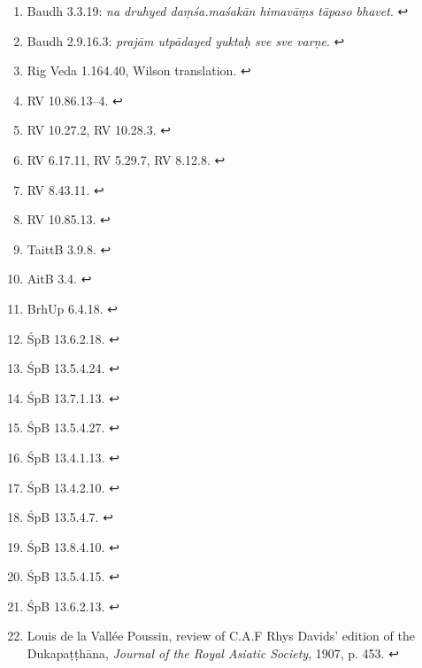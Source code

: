 \documentclass[12pt,openany]{book}%
\begin{document}
\begin{enumerate}
%
\item Baudh 3.3.19: \textit{na druhyed \textsanskrit{daṃśa}.\textsanskrit{maśakān} \textsanskrit{himavāṃs} \textsanskrit{tāpaso} bhavet}. ↩

%
\item Baudh 2.9.16.3: \textit{\textsanskrit{prajām} \textsanskrit{utpādayed} yuktaḥ sve sve \textsanskrit{varṇe}}. ↩

%
\item Rig Veda 1.164.40, Wilson translation. ↩

%
\item RV 10.86.13–4. ↩

%
\item RV 10.27.2, RV 10.28.3. ↩

%
\item RV 6.17.11, RV 5.29.7, RV 8.12.8. ↩

%
\item RV 8.43.11. ↩

%
\item RV 10.85.13. ↩

%
\item TaittB 3.9.8. ↩

%
\item AitB 3.4. ↩

%
\item BrhUp 6.4.18. ↩

%
\item ŚpB 13.6.2.18. ↩

%
\item ŚpB 13.5.4.24. ↩

%
\item ŚpB 13.7.1.13. ↩

%
\item ŚpB 13.5.4.27. ↩

%
\item ŚpB 13.4.1.13. ↩

%
\item ŚpB 13.4.2.10. ↩

%
\item ŚpB 13.5.4.7. ↩

%
\item ŚpB 13.8.4.10. ↩

%
\item ŚpB 13.5.4.15. ↩

%
\item ŚpB 13.6.2.13. ↩

%
\item Louis de la Vallée Poussin, review of C.A.F Rhys Davids’ edition of the \textsanskrit{Dukapaṭṭhāna}, \textit{Journal of the Royal Asiatic Society}, 1907, p. 453. ↩


\end{enumerate}
\end{document}
